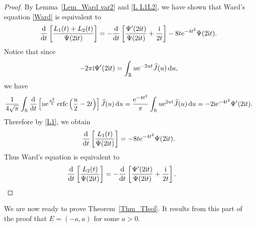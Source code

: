 \documentclass[pdftex]{sigma}
\numberwithin{equation}{section}
\newcommand{\erfc}{\operatorname{erfc}}
\newcommand{\R}{{\mathbb R}}
\newcommand{\1}{\chi}
\def\wh{\widehat}
\begin{document}
\begin{proof}
	By Lemma~\ref{Lem_Ward var2} and \eqref{L L1L2}, we have shown that Ward's equation \eqref{Ward} is equivalent to
	\begin{gather*}
		\frac{{\rm d}}{{\rm d}t} \left[ \frac{L_1(t)+L_2(t)}{\Psi(2{\rm i}t)} \right] = 	-\frac{{\rm d}}{{\rm d}t}\left[ \frac{\Psi'(2{\rm i}t)}{\Psi(2{\rm i}t)}+\frac{{\rm i}}{2t} \right]-8t {\rm e}^{-4t^2} \Psi(2{\rm i}t).
	\end{gather*}
	Notice that since
	\begin{gather*}
		-2\pi {\rm i} \Psi'(2{\rm i}t)= \int_{\R} u{\rm e}^{-2ut} \wh{J}(u)\,{\rm d}u,
	\end{gather*}
	we have
	\begin{gather*}
	\frac{1}{4\sqrt{\pi}} \int_{\R} \frac{{\rm d}}{{\rm d}t}\left[ u {\rm e}^{ \frac{u^2}{4} } \erfc\left( \frac{u}{2}-2t \right) \right] \wh{J}(u) \,{\rm d}u
	= \frac{{\rm e}^{-4t^2}}{\pi} \int_{\R} u {\rm e}^{2ut} \wh{J}(u) \,{\rm d}u=-2{\rm i}{\rm e}^{-4t^2}\Psi'(2{\rm i}t).
	\end{gather*}
	Therefore by \eqref{L1}, we obtain
	\begin{gather*}
		\frac{{\rm d}}{{\rm d}t} \left[\frac{L_1(t)}{\Psi(2{\rm i}t)}\right]=-8t {\rm e}^{-4t^2} \Psi(2{\rm i}t).
	\end{gather*}
	Thus Ward's equation is equivalent to
	\begin{gather*}
		\frac{{\rm d}}{{\rm d}t} \left[ \frac{L_2(t)}{\Psi(2{\rm i}t)} \right] = 	-\frac{{\rm d}}{{\rm d}t}\left[ \frac{\Psi'(2{\rm i}t)}{\Psi(2{\rm i}t)}+\frac{{\rm i}}{2t} \right].\tag*{\qed}
	\end{gather*}\renewcommand{\qed}{}
\end{proof}

We are now ready to prove Theorem~\ref{Thm_TIsol}. It results from this part of the proof that $E=(-a,a)$ for some $a>0$.
\end{document}

